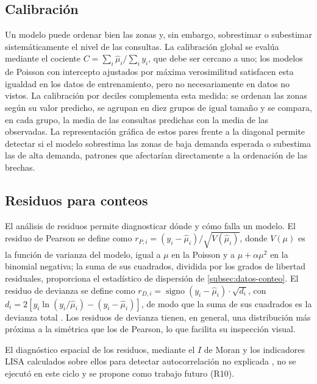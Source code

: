 \subsection{Calibración}
\label{subsec:calibracion}

Un modelo puede ordenar bien las zonas y, sin embargo, sobrestimar o subestimar
sistemáticamente el nivel de las consultas. La calibración global se evalúa mediante el
cociente $C = \sum_i \hat{\mu}_i / \sum_i y_i$, que debe ser cercano a uno; los modelos de
Poisson con intercepto ajustados por máxima verosimilitud satisfacen esta igualdad en los
datos de entrenamiento, pero no necesariamente en datos no vistos. La calibración por
deciles complementa esta medida: se ordenan las zonas según su valor predicho, se agrupan en
diez grupos de igual tamaño y se compara, en cada grupo, la media de las consultas predichas
con la media de las observadas. La representación gráfica de estos pares frente a la
diagonal permite detectar si el modelo sobrestima las zonas de baja demanda esperada o
subestima las de alta demanda, patrones que afectarían directamente a la ordenación de las
brechas.

\subsection{Residuos para conteos}
\label{subsec:residuos}

El análisis de residuos permite diagnosticar dónde y cómo falla un modelo. El residuo de
Pearson se define como $r_{P,i} = (y_i - \hat{\mu}_i) / \sqrt{V(\hat{\mu}_i)}$, donde
$V(\mu)$ es la función de varianza del modelo, igual a $\mu$ en la Poisson y a
$\mu + \alpha\mu^2$ en la binomial negativa; la suma de sus cuadrados, dividida por los
grados de libertad residuales, proporciona el estadístico de dispersión de
\ref{subsec:datos-conteo}. El residuo de devianza se define como
$r_{D,i} = \operatorname{signo}(y_i - \hat{\mu}_i) \cdot \sqrt{d_i}$, con
$d_i = 2\left[y_i \ln(y_i / \hat{\mu}_i) - (y_i - \hat{\mu}_i)\right]$, de modo que la suma
de sus cuadrados es la devianza total \parencite{mccullagh1989}. Los residuos de devianza
tienen, en general, una distribución más próxima a la simétrica que los de Pearson, lo que
facilita su inspección visual.

El diagnóstico espacial de los residuos, mediante el $I$ de Moran y los indicadores LISA
calculados sobre ellos para detectar autocorrelación no explicada \parencite{anselin1995},
no se ejecutó en este ciclo y se propone como trabajo futuro (R10).

